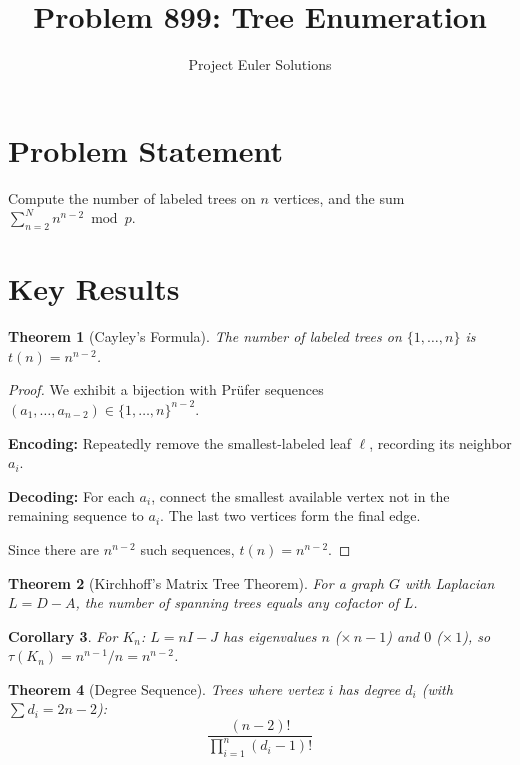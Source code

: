 \documentclass[11pt]{article}
\title{Problem 899: Tree Enumeration}
\author{Project Euler Solutions}
\date{}
\newtheorem{theorem}{Theorem}
\newtheorem{corollary}[theorem]{Corollary}
\begin{document}
\maketitle

\section{Problem Statement}
Compute the number of labeled trees on $n$ vertices, and the sum $\sum_{n=2}^{N} n^{n-2} \bmod p$.

\section{Key Results}

\begin{theorem}[Cayley's Formula]
The number of labeled trees on $\{1,\ldots,n\}$ is $t(n) = n^{n-2}$.
\end{theorem}

\begin{proof}
We exhibit a bijection with Pr\"ufer sequences $(a_1,\ldots,a_{n-2}) \in \{1,\ldots,n\}^{n-2}$.

\textbf{Encoding:} Repeatedly remove the smallest-labeled leaf $\ell$, recording its neighbor $a_i$.

\textbf{Decoding:} For each $a_i$, connect the smallest available vertex not in the remaining sequence to $a_i$. The last two vertices form the final edge.

Since there are $n^{n-2}$ such sequences, $t(n) = n^{n-2}$.
\end{proof}

\begin{theorem}[Kirchhoff's Matrix Tree Theorem]
For a graph $G$ with Laplacian $L = D - A$, the number of spanning trees equals any cofactor of $L$.
\end{theorem}

\begin{corollary}
For $K_n$: $L = nI - J$ has eigenvalues $n$ ($\times\, n{-}1$) and $0$ ($\times\, 1$), so
$\tau(K_n) = n^{n-1}/n = n^{n-2}$.
\end{corollary}

\begin{theorem}[Degree Sequence]
Trees where vertex $i$ has degree $d_i$ (with $\sum d_i = 2n-2$):
\[
\frac{(n-2)!}{\prod_{i=1}^n (d_i - 1)!}
\]
\end{theorem}
\end{document}

